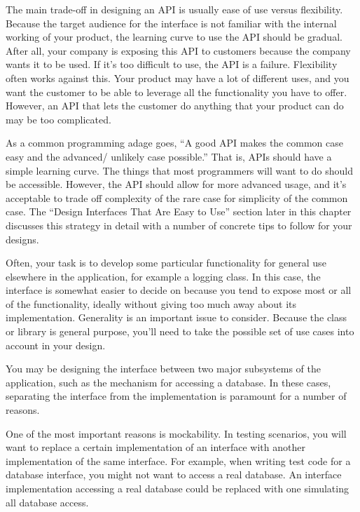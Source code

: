 The main trade-off in designing an API is usually ease of use versus flexibility. Because the target audience for the interface is not familiar with the internal working of your product, the learning curve to use the API should be gradual. After all, your company is exposing this API to customers because the company wants it to be used. If it’s too difficult to use, the API is a failure. Flexibility often works against this. Your product may have a lot of different uses, and you want the customer to be able to leverage all the functionality you have to offer. However, an API that lets the customer do anything that your product can do may be too complicated.

As a common programming adage goes, “A good API makes the common case easy and the advanced/ unlikely case possible.” That is, APIs should have a simple learning curve. The things that most programmers will want to do should be accessible. However, the API should allow for more advanced usage, and it’s acceptable to trade off complexity of the rare case for simplicity of the common case. The “Design Interfaces That Are Easy to Use” section later in this chapter discusses this strategy in detail with a number of concrete tips to follow for your designs.


Often, your task is to develop some particular functionality for general use elsewhere in the application, for example a logging class. In this case, the interface is somewhat easier to decide on because you tend to expose most or all of the functionality, ideally without giving too much away about its implementation. Generality is an important issue to consider. Because the class or library is general purpose, you’ll need to take the possible set of use cases into account in your design.


You may be designing the interface between two major subsystems of the application, such as the mechanism for accessing a database. In these cases, separating the interface from the implementation is paramount for a number of reasons.

One of the most important reasons is mockability. In testing scenarios, you will want to replace a certain implementation of an interface with another implementation of the same interface. For example, when writing test code for a database interface, you might not want to access a real database. An interface implementation accessing a real database could be replaced with one simulating all database access.

